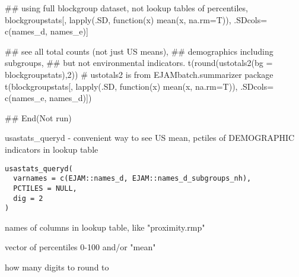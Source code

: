 \documentclass[a4paper]{book}
\begin{document}
\begin{Examples}
\begin{ExampleCode}
## using full blockgroup dataset, not lookup tables of percentiles, 
blockgroupstats[, lapply(.SD, function(x) mean(x, na.rm=T)),  .SDcols= c(names_d, names_e)]

##   see all total counts (not just US means), 
##   demographics including subgroups, 
##   but not environmental indicators.
t(round(ustotals2(bg = blockgroupstats),2)) #  ustotals2 is from EJAMbatch.summarizer package
t(blockgroupstats[, lapply(.SD, function(x) mean(x, na.rm=T)),
    .SDcols= c(names_e, names_d)])


## End(Not run)

\end{ExampleCode}
\end{Examples}
%
\begin{Description}\relax
usastats\_queryd - convenient way to see US mean, pctiles of DEMOGRAPHIC indicators in lookup table
\end{Description}
%
\begin{Usage}
\begin{verbatim}
usastats_queryd(
  varnames = c(EJAM::names_d, EJAM::names_d_subgroups_nh),
  PCTILES = NULL,
  dig = 2
)
\end{verbatim}
\end{Usage}
%
\begin{Arguments}
\begin{ldescription}
\item[\code{varnames}] names of columns in lookup table, like "proximity.rmp"

\item[\code{PCTILES}] vector of percentiles 0-100 and/or "mean"

\item[\code{dig}] how many digits to round to
\end{ldescription}
\end{Arguments}
%
\end{document}
